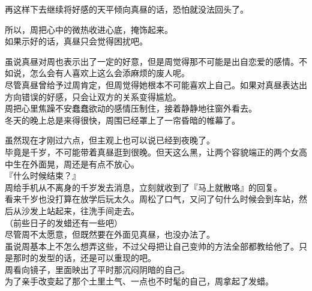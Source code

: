 再这样下去继续将好感的天平倾向真昼的话，恐怕就没法回头了。

所以，周把心中的微热收进心底，掩饰起来。\\

如果示好的话，真昼只会觉得困扰吧。

虽说真昼对周也表示出了一定的好意，但是周觉得那不可能是出自恋爱的感情。不如说，怎么会有人喜欢上这么会添麻烦的废人呢。\\

尽管真昼曾给予过周肯定，但周觉得她根本不可能喜欢上自己。如果对真昼表达出方向错误的好感，只会让双方的关系变得尴尬。\\

周把心里焦躁不安蠢蠢欲动的感情压制住，接着静静地往窗外看去。\\

冬天的晚上总是来得很快，周围已经罩上了一帘昏暗的帷幕了。

虽然现在才刚过六点，但主观上也可以说已经到夜晚了。\\

毕竟是千岁，不可能带着真昼逛到很晚。但天这么黑，让两个容貌端正的两个女高中生在外面晃，周还是有点不放心。\\

『什么时候结束？』\\

周给手机从不离身的千岁发去消息，立刻就收到了『马上就散咯』的回复。\\

看来千岁也没打算在放学后玩太久。周松了口气，又问了句什么时候会到车站，然后从沙发上站起来，往洗手间走去。\\

（前些日子的发蜡还有一些吧）\\

尽管周不太愿意，但既然要在外面见真昼，也没办法了。\\

虽说周基本上不怎么想弄这些，不过父母把让自己变帅的方法全部都教给他了。只是那时的发型的话，还是可以重现的吧。\\

周看向镜子，里面映出了平时那沉闷阴暗的自己。\\

为了亲手改变起了那个土里土气、一点也不时髦的自己，周拿起了发蜡。
